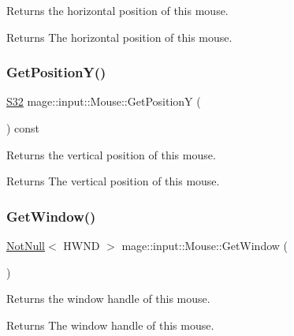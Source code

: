 Returns the horizontal position of this mouse.

\begin{DoxyReturn}{Returns}
The horizontal position of this mouse. 
\end{DoxyReturn}
\mbox{\label{classmage_1_1input_1_1_mouse_a81bf0ebd5fb34a25ba9f5d4c7aea1ed6}} 
\subsubsection{\texorpdfstring{Get\+Position\+Y()}{GetPositionY()}}
{\footnotesize\ttfamily \mbox{\hyperlink{namespacemage_a642e05c5c83642b6946703615cdbf2da}{S32}} mage\+::input\+::\+Mouse\+::\+Get\+PositionY (\begin{DoxyParamCaption}{ }\end{DoxyParamCaption}) const\hspace{0.3cm}{\ttfamily [noexcept]}}

Returns the vertical position of this mouse.

\begin{DoxyReturn}{Returns}
The vertical position of this mouse. 
\end{DoxyReturn}
\mbox{\label{classmage_1_1input_1_1_mouse_a5fd893af2aede58106b718448e7e0dde}} 
\subsubsection{\texorpdfstring{Get\+Window()}{GetWindow()}}
{\footnotesize\ttfamily \mbox{\hyperlink{namespacemage_a8769f9d670d6b585ea306cb1062af94b}{Not\+Null}}$<$ H\+W\+ND $>$ mage\+::input\+::\+Mouse\+::\+Get\+Window (\begin{DoxyParamCaption}{ }\end{DoxyParamCaption})\hspace{0.3cm}{\ttfamily [noexcept]}}

Returns the window handle of this mouse.

\begin{DoxyReturn}{Returns}
The window handle of this mouse. 
\end{DoxyReturn}
\mbox{\label{classmage_1_1input_1_1_mouse_af4ce64a7808af28c80bc9c01c83f7d14}} 
